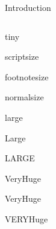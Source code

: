 \documentclass[final,hyperref={pdfpagelabels=false}]{beamer}
\begin{document}
\begin{frame}{}
\begin{columns}[T]
\begin{column}{.43\paperwidth}
\begin{block}{Introduction}
\end{block}
    
\end{column}

\end{columns}
\vfill    
\begin{block}{}
	\centering
	{\tiny tiny}\par
	{\scriptsize scriptsize}\par
	{\footnotesize footnotesize}\par
	{\normalsize normalsize}\par
	{\large large}\par
	{\Large Large}\par
	{\LARGE LARGE}\par
	{\veryHuge VeryHuge}\par
	{\VeryHuge VeryHuge}\par
	{\VERYHuge VERYHuge}\par
\end{block}
\vfill
\end{frame}
\end{document}
